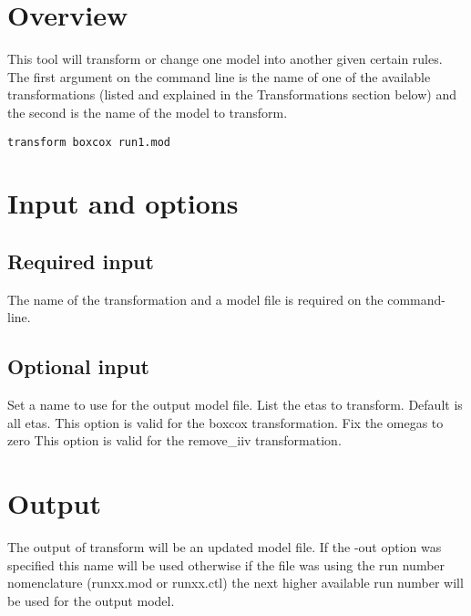 



\maketitle
\newcommand{\guidetoolname}{transform}


\section{Overview}
This tool will transform or change one model into another given certain rules. The first argument on the command line is the name of one of the available transformations (listed and explained in the Transformations section below) and the second is the name of the model to transform.

\begin{verbatim}
transform boxcox run1.mod
\end{verbatim}

\section{Input and options}

\subsection{Required input}
The name of the transformation and a model file is required on the command-line.


\subsection{Optional input}

\begin{optionlist}
Set a name to use for the output model file. 
\nextopt
{}
List the etas to transform. Default is all etas.
This option is valid for the boxcox transformation.
\nextopt
      Fix the omegas to zero
      This option is valid for the remove\_iiv transformation.
    \nextopt
\end{optionlist}

\section{Output}

The output of transform will be an updated model file. If the -out option was specified this name will be used otherwise if the file was using the run number nomenclature (runxx.mod or runxx.ctl) the next higher available run number will be used for the output model.


